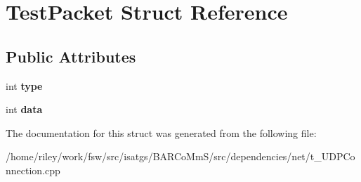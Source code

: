 \hypertarget{struct_test_packet}{}\section{Test\+Packet Struct Reference}
\label{struct_test_packet}
\subsection*{Public Attributes}
\begin{DoxyCompactItemize}
\item 
int {\bfseries type}\hypertarget{struct_test_packet_af0f2ab8b756f8719f4e2f0fc3bd94f34}{}\label{struct_test_packet_af0f2ab8b756f8719f4e2f0fc3bd94f34}

\item 
int {\bfseries data}\hypertarget{struct_test_packet_a0d8109e718a162d0d8148752f7fb4863}{}\label{struct_test_packet_a0d8109e718a162d0d8148752f7fb4863}

\end{DoxyCompactItemize}


The documentation for this struct was generated from the following file\+:\begin{DoxyCompactItemize}
\item 
/home/riley/work/fsw/src/isatgs/\+B\+A\+R\+Co\+Mm\+S/src/dependencies/net/t\+\_\+\+U\+D\+P\+Connection.\+cpp\end{DoxyCompactItemize}
